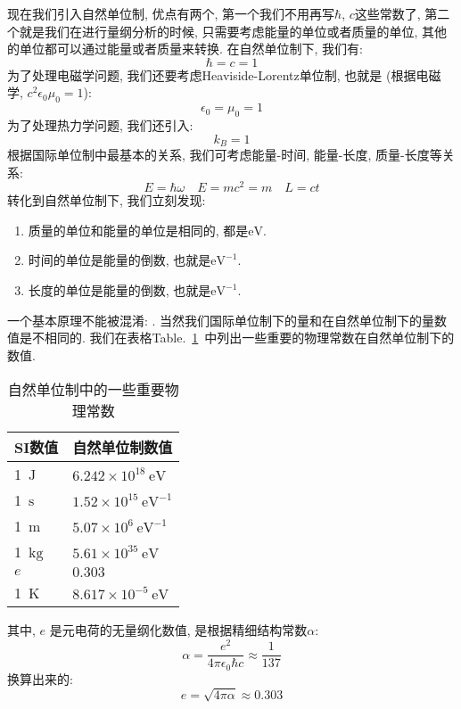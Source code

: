 现在我们引入自然单位制, 优点有两个, 第一个我们不用再写$\hbar$, $c$这些常数了, 第二个就是我们在进行量纲分析的时候, 只需要考虑能量的单位或者质量的单位, 其他的单位都可以通过能量或者质量来转换.
在自然单位制下, 我们有:
\begin{equation}
  \hbar = c = 1
\end{equation}
为了处理电磁学问题, 我们还要考虑Heaviside-Lorentz单位制, 也就是 (根据电磁学, $c^2 \epsilon_0 \mu_0 = 1$):
\begin{equation}
  \epsilon_0 = \mu_0 = 1
\end{equation}
为了处理热力学问题, 我们还引入:
\begin{equation}
  k_B = 1
\end{equation}
根据国际单位制中最基本的关系, 我们可考虑能量-时间, 能量-长度, 质量-长度等关系:
\begin{equation}
  E = \hbar \omega  \quad E = m c^2 = m \quad L=c t
\end{equation}
转化到自然单位制下, 我们立刻发现:
\begin{enumerate}
\item 质量的单位和能量的单位是相同的, 都是$\mathrm{eV}$.
\item 时间的单位是能量的倒数, 也就是$\mathrm{eV}^{-1}$.
\item 长度的单位是能量的倒数, 也就是$\mathrm{eV}^{-1}$.
\end{enumerate}
一个基本原理不能被混淆: .
当然我们国际单位制下的量和在自然单位制下的量数值是不相同的.
我们在表格Table.~\ref{tab:natural_units_physical_constants}~中列出一些重要的物理常数在自然单位制下的数值.
\begin{table}[h!]
\centering
\begin{tabular}{|l|l|}
  \hline
  SI数值 & 自然单位制数值 \\
  \hline
  1~$\mathrm{J}$ & $6.242 \times 10^{18}~\mathrm{eV}$ \\
  1~$\mathrm{s}$ & $1.52 \times 10^{15}~\mathrm{eV}^{-1}$ \\
  1~$\mathrm{m}$ & $5.07 \times 10^{6}~\mathrm{eV}^{-1}$ \\
  1~$\mathrm{kg}$ & $5.61 \times 10^{35}~\mathrm{eV}$ \\
  $e$ & $0.303$ \\
  1~$\mathrm{K}$ & $8.617 \times 10^{-5}~\mathrm{eV}$ \\
  \hline
\end{tabular}
\caption{自然单位制中的一些重要物理常数}
\label{tab:natural_units_physical_constants}
\end{table}
其中, $e$ 是元电荷的无量纲化数值, 是根据精细结构常数$\alpha$:
\begin{equation}
  \alpha = \frac{e^2}{4\pi\epsilon_0 \hbar c} \approx \frac{1}{137}
\end{equation}
换算出来的:
\begin{equation}
  e = \sqrt{4\pi\alpha} \approx 0.303
\end{equation}

